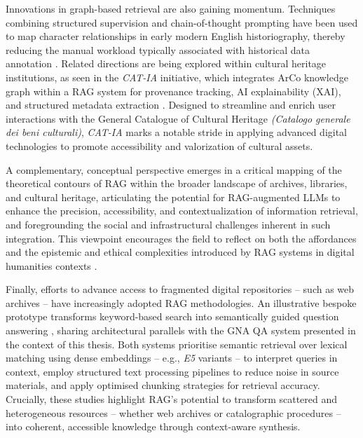\begin{spacing}{1.5}
Innovations in graph-based retrieval are also gaining momentum. Techniques combining structured supervision and chain-of-thought prompting have been used to map character relationships in early modern English historiography, thereby reducing the manual workload typically associated with historical data annotation \citep{fan_research_2025}. Related directions are being explored within cultural heritage institutions, as seen in the \textit{CAT-IA} initiative, which integrates ArCo knowledge graph \citep{carriero_arco_2019} within a RAG system for provenance tracking, AI explainability (XAI), and structured metadata extraction \citep{barbato_nasce_2025}. Designed to streamline and enrich user interactions with the General Catalogue of Cultural Heritage \textit{(Catalogo generale dei beni culturali)}, \textit{CAT-IA} marks a notable stride in applying advanced digital technologies to promote accessibility and valorization of cultural assets.

A complementary, conceptual perspective emerges in a critical mapping of the theoretical contours of RAG within the broader landscape of archives, libraries, and cultural heritage, articulating the potential for RAG-augmented LLMs to enhance the precision, accessibility, and contextualization of information retrieval, and foregrounding the social and infrastructural challenges inherent in such integration. This viewpoint encourages the field to reflect on both the affordances and the epistemic and ethical complexities introduced by RAG systems in digital humanities contexts \citep{di_marcantonio_intelligenza_2024}.


Finally, efforts to advance access to fragmented digital repositories -- such as web archives -- have increasingly adopted RAG methodologies. An illustrative bespoke prototype transforms keyword-based search into semantically guided question answering \citep{davis_unlocking_2025}, sharing architectural parallels with the GNA QA system presented in the context of this thesis. Both systems prioritise semantic retrieval over lexical matching using dense embeddings -- e.g., \textit{E5} variants \citep{wang_text_2024} -- to interpret queries in context, employ structured text processing pipelines to reduce noise in source materials, and apply optimised chunking strategies for retrieval accuracy. Crucially, these studies highlight RAG’s potential to transform scattered and heterogeneous resources -- whether web archives or catalographic procedures -- into coherent, accessible knowledge through context-aware synthesis.


\end{spacing}

